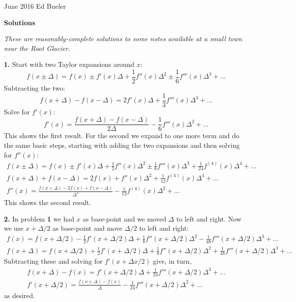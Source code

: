 \documentclass[10pt]{amsart}
\newcommand{\normalspacing}{\renewcommand{\baselinestretch}{1.05}
        \tiny\normalsize}
\newcommand{\prob}[1]{\bigskip\noindent\large\textbf{#1.}\normalsize }
\begin{document}
\scriptsize
\noindent June 2016 \hfill Ed Bueler

\vspace{10mm}

\Large\centerline{\textbf{Solutions}}

\medskip
\small
\centerline{\emph{These are reasonably-complete solutions to some notes available at a small town near the Root Glacier.}}
\normalsize

\bigskip\bigskip

\thispagestyle{empty}
\normalspacing

\prob{1}  Start with two Taylor expansions around $x$:
    $$f(x\pm \Delta) = f(x) \pm f'(x) \Delta + \frac{1}{2} f''(x) \Delta^2 \pm \frac{1}{6} f'''(x) \Delta^3 + \dots$$
Subtracting the two:
    $$f(x+\Delta) - f(x-\Delta) = 2 f'(x) \Delta + \frac{1}{3} f'''(x) \Delta^3 + \dots$$
Solve for $f'(x)$:
    $$f'(x) = \frac{f(x+\Delta) - f(x-\Delta)}{2\Delta} - \frac{1}{6} f'''(x) \Delta^2 + \dots$$
This shows the first result.  For the second we expand to one more term and do the same basic steps, starting with adding the two expansions and then solving for $f''(x)$:
\begin{gather*}
    f(x\pm \Delta) = f(x) \pm f'(x) \Delta + \frac{1}{2} f''(x) \Delta^2 \pm \frac{1}{6} f'''(x) \Delta^3 + \frac{1}{24} f^{(4)}(x) \Delta^4 + \dots \\
    f(x + \Delta) + f(x - \Delta) = 2 f(x) + f''(x) \Delta^2 + \frac{1}{12} f^{(4)}(x) \Delta^4 + \dots \\
    f''(x) = \frac{f(x + \Delta) - 2 f(x) + f(x - \Delta)}{\Delta^2} - \frac{1}{12} f^{(4)}(x) \Delta^2 + \dots
\end{gather*}
This shows the second result.

\prob{2}  In problem \textbf{1} we had $x$ as base-point and we moved $\Delta$ to left and right.  Now we use $x+\Delta/2$ as base-point and move $\Delta/2$ to left and right:
\begin{gather*}
f(x) = f(x+\Delta/2) - \frac{1}{2} f'(x+\Delta/2) \Delta + \frac{1}{8} f''(x+\Delta/2) \Delta^2 - \frac{1}{48} f'''(x+\Delta/2) \Delta^3 + \dots \\
f(x+\Delta) = f(x+\Delta/2) + \frac{1}{2} f'(x+\Delta/2) \Delta + \frac{1}{8} f''(x+\Delta/2) \Delta^2 + \frac{1}{48} f'''(x+\Delta/2) \Delta^3 + \dots
\end{gather*}
Subtracting these and solving for $f'(x+\Delta x/2)$ give, in turn,
\begin{gather*}
f(x+\Delta) - f(x) = f'(x+\Delta/2) \Delta + \frac{1}{24} f'''(x+\Delta/2) \Delta^3 + \dots \\
f'(x+\Delta/2) = \frac{f(x+\Delta) - f(x)}{\Delta} - \frac{1}{24} f'''(x+\Delta/2) \Delta^2 + \dots
\end{gather*}
as desired.
\end{document}
